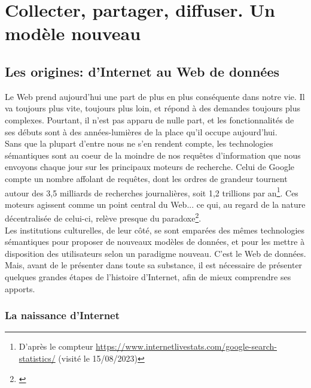 \documentclass[a4paper,12pt,twoside]{book}
\begin{document}
 
	
	\thispagestyle{empty}
	\cleardoublepage
	
	\mainmatter
	
	
	\part{Collecter, partager, diffuser. Un modèle nouveau}
	
	\chapter{Les origines: d'Internet au Web de données}
Le Web prend aujourd'hui une part de plus en plus conséquente dans notre vie. Il va toujours plus vite, toujours plus loin, et répond à des demandes toujours plus complexes. Pourtant, il n'est pas apparu de nulle part, et les fonctionnalités de ses débuts sont à des années-lumières de la place qu'il occupe aujourd'hui.\\

Sans que la plupart d'entre nous ne s'en rendent compte, les technologies sémantiques sont au coeur de la moindre de nos requêtes d'information que nous envoyons chaque jour sur les principaux moteurs de recherche. Celui de Google compte un nombre affolant de requêtes, dont les ordres de grandeur tournent autour des 3,5 milliards de recherches journalières, soit 1,2 trillions par an\footnote{D'après le compteur \url{https://www.internetlivestats.com/google-search-statistics/} (visité le 15/08/2023)}. Ces moteurs agissent comme un point central du Web... ce qui, au regard de la nature décentralisée de celui-ci, relève presque du paradoxe\footnote{\cite{poupeauReflexionsQuestionsAutour2018}}.\\

Les institutions culturelles, de leur côté, se sont emparées des mêmes technologies sémantiques pour proposer de nouveaux modèles de données, et pour les mettre à disposition des utilisateurs selon un paradigme nouveau. C'est le Web de données. Mais, avant de le présenter dans toute sa substance, il est nécessaire de présenter quelques grandes étapes de l'histoire d'Internet, afin de mieux comprendre ses apports.\\ 


 \section{La naissance d'Internet}
\end{document}

